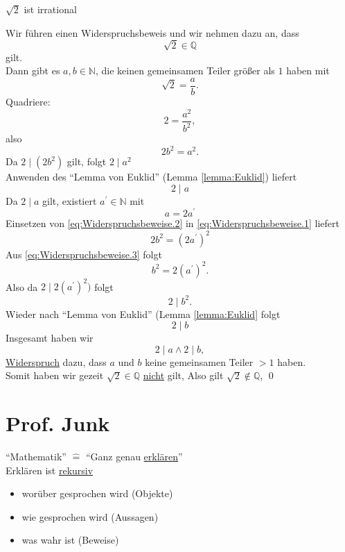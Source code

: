 \documentclass{gadsescript}
\begin{document}
\begin{subtheorem}
	\label{theorem:Sqrt2IstIrrational}
	$ \sqrt{2} $ ist irrational
\end{subtheorem}
\begin{subproof}
	Wir führen einen Widerspruchsbeweis und wir nehmen dazu an, dass
	\[ \sqrt{2} \in \mathbb{Q} \]
	gilt.\\
	Dann gibt es $ a, b \in \mathbb{N} $, die keinen gemeinsamen Teiler größer als $ 1 $ haben mit
	\[ \sqrt{2} = \frac{a}{b}. \]
	Quadriere:
	\[ 2 = \frac{a^2}{b^2}, \]
	also
	\begin{equation}
		\label{eq:Widerspruchsbeweise.1}
		2b^2 = a^2.
	\end{equation}
	Da $ 2 \mid ( 2b^2 ) $ gilt, folgt $ 2 \mid a^2 $\\
	Anwenden des ``Lemma von Euklid'' (Lemma \ref{lemma:Euklid}) liefert
	\[ 2 \mid a \]
	Da $ 2 \mid a $ gilt, existiert $ a^{\prime} \in \mathbb{N} $ mit
	\begin{equation}
		\label{eq:Widerspruchsbeweise.2}
		a = 2 a^{\prime}
	\end{equation}
	Einsetzen von \ref{eq:Widerspruchsbeweise.2} in \ref{eq:Widerspruchsbeweise.1} liefert
	\begin{equation}
		\label{eq:Widerspruchsbeweise.3}
		2b^2 = ( 2a^{\prime} )^2
	\end{equation}
	Aus \ref{eq:Widerspruchsbeweise.3} folgt
	\[ b^2 = 2 ( a^{\prime} )^2. \]
	Also da $ 2 \mid 2 ( a^{\prime} )^2 ) $ folgt
	\[ 2 \mid b^2. \]
	Wieder nach ``Lemma von Euklid'' (Lemma \ref{lemma:Euklid} folgt
	\[ 2 \mid b \]
	Insgesamt haben wir
	\[ 2\mid a \wedge 2 \mid b, \]
	\underline{Widerspruch} dazu, dass $ a $ und $ b $ keine gemeinsamen Teiler $ >1 $ haben.\\
	Somit haben wir gezeit $ \sqrt{2} \in \mathbb{Q} $ \underline{nicht} gilt, Also gilt $ \sqrt{2} \notin \mathbb{Q} $, \qed
\end{subproof}

\section{Prof. Junk}
``Mathematik'' $ \hat= $ ``Ganz genau \underline{erklären}''\\
Erklären ist \underline{rekursiv}
\begin{itemize}
	\item worüber gesprochen wird (Objekte)
	\item wie gesprochen wird (Aussagen)
	\item was wahr ist (Beweise)
\end{itemize}
\end{document}
